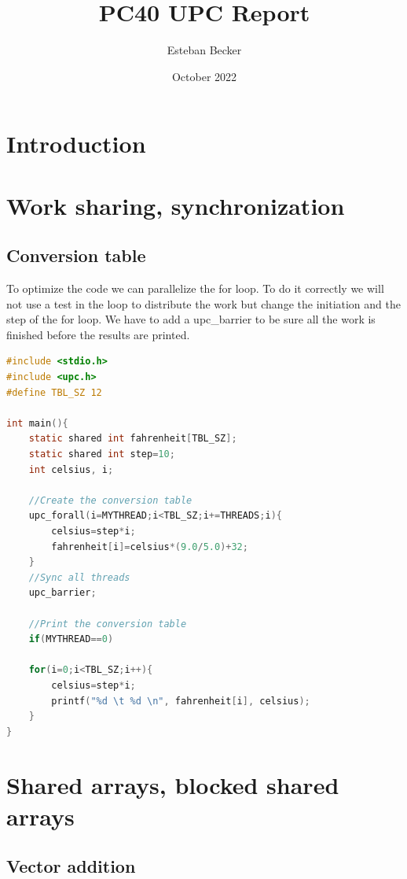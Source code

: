 \documentclass{report}
\title{PC40 UPC Report}
\author{Esteban Becker}
\date{October 2022}
\begin{document}
\maketitle

\tableofcontents

\chapter{Introduction}

\chapter{Work sharing, synchronization}

\section{Conversion table}

To optimize the code we can parallelize the for loop. To do it correctly we will not use a test in the loop to distribute the work but change the initiation and the step of the for loop.\newline
We have to add a upc\_barrier to be sure all the work is finished before the results are printed.

\begin{lstlisting}[language=C]
#include <stdio.h>
#include <upc.h>
#define TBL_SZ 12

int main(){
    static shared int fahrenheit[TBL_SZ];
    static shared int step=10; 
    int celsius, i;

    //Create the conversion table
    upc_forall(i=MYTHREAD;i<TBL_SZ;i+=THREADS;i){
        celsius=step*i;
        fahrenheit[i]=celsius*(9.0/5.0)+32;
    }
    //Sync all threads
    upc_barrier;

    //Print the conversion table
    if(MYTHREAD==0)

    for(i=0;i<TBL_SZ;i++){
        celsius=step*i;
        printf("%d \t %d \n", fahrenheit[i], celsius);
    }
}

\end{lstlisting}


\chapter{Shared arrays, blocked shared arrays}



\section{Vector addition}
\end{document}
